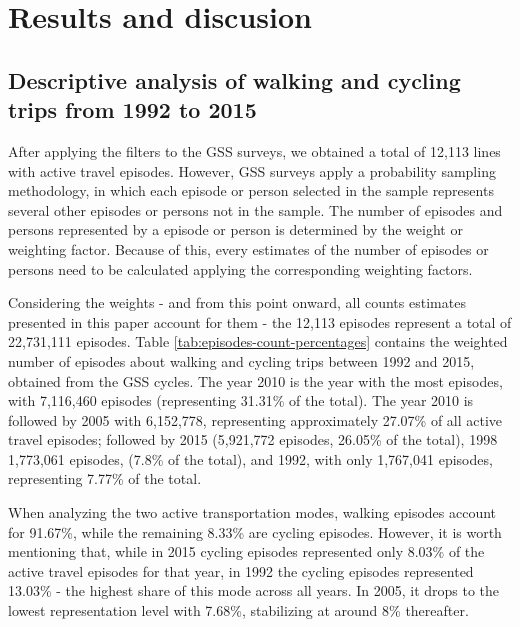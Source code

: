 \documentclass[preprint, 3p,
authoryear]{elsarticle} %
\begin{document}
\hypertarget{results-and-discusion}{%
\section{Results and discusion}\label{results-and-discusion}}

\hypertarget{descriptive-analysis-of-walking-and-cycling-trips-from-1992-to-2015}{%
\subsection{Descriptive analysis of walking and cycling trips from 1992
to
2015}\label{descriptive-analysis-of-walking-and-cycling-trips-from-1992-to-2015}}

After applying the filters to the GSS surveys, we obtained a total of
12,113 lines with active travel episodes. However, GSS surveys apply a
probability sampling methodology, in which each episode or person
selected in the sample represents several other episodes or persons not
in the sample. The number of episodes and persons represented by a
episode or person is determined by the weight or weighting factor.
Because of this, every estimates of the number of episodes or persons
need to be calculated applying the corresponding weighting factors.

Considering the weights - and from this point onward, all counts
estimates presented in this paper account for them - the 12,113 episodes
represent a total of 22,731,111 episodes. Table
\ref{tab:episodes-count-percentages} contains the weighted number of
episodes about walking and cycling trips between 1992 and 2015, obtained
from the GSS cycles. The year 2010 is the year with the most episodes,
with 7,116,460 episodes (representing 31.31\% of the total). The year
2010 is followed by 2005 with 6,152,778, representing approximately
27.07\% of all active travel episodes; followed by 2015 (5,921,772
episodes, 26.05\% of the total), 1998 1,773,061 episodes, (7.8\% of the
total), and 1992, with only 1,767,041 episodes, representing 7.77\% of
the total.

When analyzing the two active transportation modes, walking episodes
account for 91.67\%, while the remaining 8.33\% are cycling episodes.
However, it is worth mentioning that, while in 2015 cycling episodes
represented only 8.03\% of the active travel episodes for that year, in
1992 the cycling episodes represented 13.03\% - the highest share of
this mode across all years. In 2005, it drops to the lowest
representation level with 7.68\%, stabilizing at around 8\% thereafter.
\end{document}
